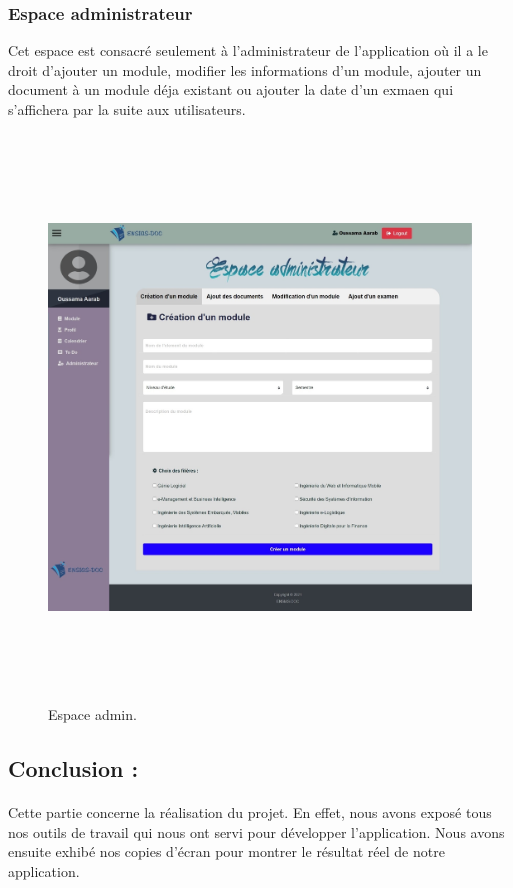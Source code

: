 \documentclass{article}
\begin{document}
{{{\subsubsection{Espace administrateur}{Cet espace est consacré seulement à l'administrateur de l'application où il a le droit d'ajouter un module, modifier les informations d'un module, ajouter un document à un module déja existant ou ajouter la date d'un exmaen qui s'affichera par la suite aux utilisateurs.
\begin{figure}[H]
    \centering
    \includegraphics[width=17cm,height=15cm]{Admin.jpeg}
    \caption{Espace admin.}
    \label{Espace admin.}
\end{figure}
\subsection{Conclusion :}
\onehalfspacing\paragraph{}{
Cette partie concerne la réalisation du projet. En effet, nous avons exposé tous nos outils de travail qui nous ont servi pour développer l'application. Nous avons ensuite exhibé nos copies d'écran pour montrer le résultat réel de notre application.

}}}}}
\end{document}
